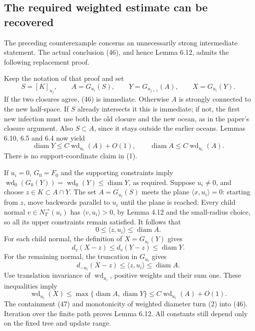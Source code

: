 \documentclass[10pt]{article}
\begin{document}
\subsection*{The required weighted estimate can be recovered}
The preceding counterexample concerns an unnecessarily strong intermediate statement. The actual conclusion (46), and hence Lemma 6.12, admits the following replacement proof.\par
Keep the notation of that proof and set \[S=[K]_{u_j},\qquad A=G_{u_i}(S),\qquad
 Y=G_{u_{j+1}}(A),\qquad X=G_{u_i}(Y).\] If the two closures agree, (46) is immediate. Otherwise \(A\) is strongly connected to the new half-space. If \(S\) already intersects it this is immediate; if not, the first new infection must use both the old closure and the new ocean, as in the paper’s closure argument. Also \(S\subset A\), since it stays outside the earlier oceans. Lemmas 6.10, 6.5 and 6.4 now yield \[\operatorname{diam}Y\le C\operatorname{wd}_{u_i}(A)+O(1),\qquad
 \operatorname{diam}A\le C\operatorname{wd}_{u_i}(A).                         \tag{1}\] There is no support-coordinate claim in (1).\par
If \(u_i=0\), \(G_0=F_0\) and the supporting constraints imply \(\operatorname{wd}_0(G_0(Y))=\operatorname{wd}_0(Y)\le\operatorname{diam}Y\), as required. Suppose \(u_i\ne0\), and choose \(z\in K\subset A\cap Y\). The set \(A=G_{u_i}(S)\) meets the plane \(\langle x,u_i\rangle=0\): starting from \(z\), move backwards parallel to \(u_i\) until the plane is reached. Every child normal \(v\in N_T^\to(u_i)\) has \(\langle v,u_i\rangle>0\), by Lemma 4.12 and the small-radius choice, so all its upper constraints remain satisfied. It follows that \[0\le\langle z,u_i\rangle\le\operatorname{diam}A.\] For each child normal, the definition of \(X=G_{u_i}(Y)\) gives \[d_v(X-z)\le d_v(Y-z)\le\operatorname{diam}Y.\] For the remaining normal, the truncation in \(G_{u_i}\) gives \[d_{-u_i}(X-z)\le\langle z,u_i\rangle\le\operatorname{diam}A.\] Use translation invariance of \(\operatorname{wd}_{u_i}\), positive weights and their sum one. These inequalities imply \[\operatorname{wd}_{u_i}(X)
 \le\max\{\operatorname{diam}A,\operatorname{diam}Y\}
 \le C\operatorname{wd}_{u_i}(A)+O(1).                          \tag{2}\] The containment (47) and monotonicity of weighted diameter turn (2) into (46). Iteration over the finite path proves Lemma 6.12. All constants still depend only on the fixed tree and update range.\par
\end{document}
